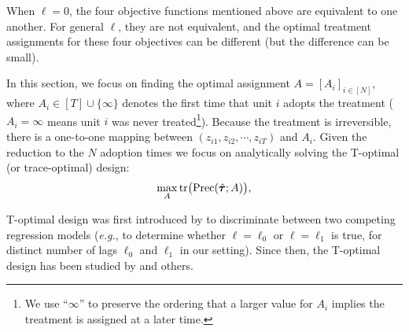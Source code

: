 
    When $\ell = 0$, the four objective functions mentioned above are equivalent to one another. For general $\ell$, they are not equivalent, and the optimal treatment assignments for these four objectives can be different (but the difference
can be small). 

    In this section, we focus on finding the optimal assignment
    $A = [A_i]_{i \in [N]}$, where $A_i \in [T] \cup \{\infty\}$ denotes the first time that unit $i$ adopts the treatment ($A_i=\infty$ means unit $i$ was never treated\footnote{We use ``$\infty$'' to preserve the ordering that a larger value for $A_i$ implies the treatment is assigned at a later time.}). Because the treatment is irreversible, there is a one-to-one mapping between $(z_{i1}, z_{i2}, \cdots, z_{iT})$ and $A_i$. Given the reduction to the $N$ adoption times we focus on
    analytically solving the T-optimal (or trace-optimal) design:
	 \begin{equation}\label{eqn:obj}
 {\textcolor{black}{\max_{A}  \mathrm{tr}\big(\mathrm{Prec}(\hat{\bm{\tau}}; A)  \big)  ,}}
	\end{equation}
	

	T-optimal design was first introduced by \cite{atkinson1975design} to discriminate between two competing regression models ({\it e.g.}, to determine whether $\ell = \ell_0$ or $\ell = \ell_1$ is true, for distinct number of lags $\ell_0$ and $\ell_1$ in our setting). Since then, the T-optimal design has been studied by \cite{atkinson1975optimal,ucinski2005t,wiens2009robust,dette2012t,dette2013robust,dette2015bayesian} and others.  
	
